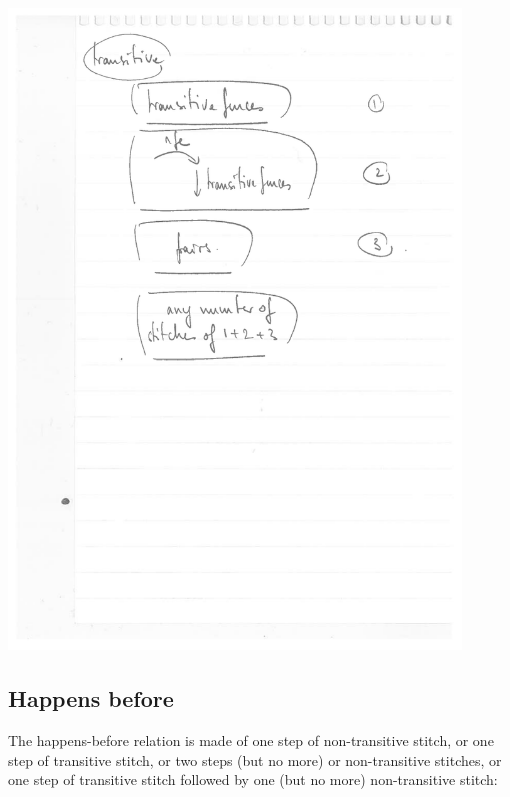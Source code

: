 \documentclass[a4paper]{article}
\begin{document}
\includegraphics[width=12cm]{trans-stitch}

\pagebreak

\subsection{Happens before}

The happens-before relation is made of one step of non-transitive stitch, or
one step of transitive stitch, or two steps (but no more) or non-transitive
stitches, or one step of transitive stitch followed by one (but no more)
non-transitive stitch:
\end{document}
